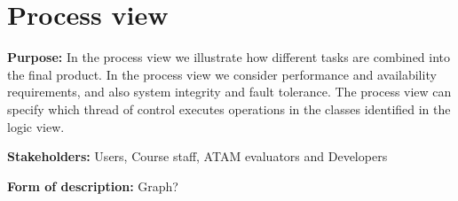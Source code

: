     \section{Process view}
    \noindent\textbf{Purpose:} In the process view we illustrate how different tasks are combined into the final product. In the process view we consider performance and availability requirements, and also system integrity and fault tolerance.
    The process view can specify which thread of control executes operations in the classes identified in the logic view. 
    
    \noindent\textbf{Stakeholders:} Users, Course staff, ATAM evaluators and Developers 
    
    \noindent\textbf{Form of description:} Graph?
